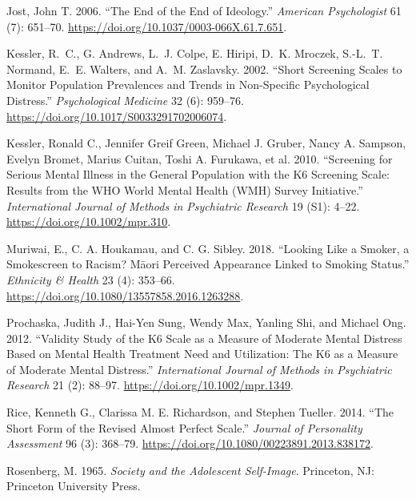 \documentclass[
  letterpaper,
  DIV=11,
  numbers=noendperiod]{scrartcl}
\newlength{\cslhangindent}
\newlength{\cslentryspacingunit} %
\newenvironment{CSLReferences}[2] %
 {%
  \setlength{\parindent}{0pt}
  \ifodd #1
  \let\oldpar\par
  \def\par{\hangindent=\cslhangindent\oldpar}
  \fi
  \setlength{\parskip}{#2\cslentryspacingunit}
 }%
 {}
\begin{document}
\begin{CSLReferences}{1}{0}
\leavevmode{}%
Jost, John T. 2006. {``The End of the End of Ideology.''} \emph{American
Psychologist} 61 (7): 651--70.
\url{https://doi.org/10.1037/0003-066X.61.7.651}.

\leavevmode{}%
Kessler, R.~C., G. Andrews, L.~J. Colpe, E. Hiripi, D.~K. Mroczek,
S.-L.~T. Normand, E.~E. Walters, and A.~M. Zaslavsky. 2002. {``Short
Screening Scales to Monitor Population Prevalences and Trends in
Non-Specific Psychological Distress.''} \emph{Psychological Medicine} 32
(6): 959--76. \url{https://doi.org/10.1017/S0033291702006074}.

\leavevmode{}%
Kessler, Ronald C., Jennifer Greif Green, Michael J. Gruber, Nancy A.
Sampson, Evelyn Bromet, Marius Cuitan, Toshi A. Furukawa, et al. 2010.
{``Screening for Serious Mental Illness in the General Population with
the K6 Screening Scale: Results from the WHO World Mental Health (WMH)
Survey Initiative.''} \emph{International Journal of Methods in
Psychiatric Research} 19 (S1): 4--22.
\url{https://doi.org/10.1002/mpr.310}.

\leavevmode{}%
Muriwai, E., C. A. Houkamau, and C. G. Sibley. 2018. {``Looking Like a
Smoker, a Smokescreen to Racism? Māori Perceived Appearance Linked to
Smoking Status.''} \emph{Ethnicity \& Health} 23 (4): 353--66.
\url{https://doi.org/10.1080/13557858.2016.1263288}.

\leavevmode{}%
Prochaska, Judith J., Hai-Yen Sung, Wendy Max, Yanling Shi, and Michael
Ong. 2012. {``Validity Study of the K6 Scale as a Measure of Moderate
Mental Distress Based on Mental Health Treatment Need and Utilization:
The K6 as a Measure of Moderate Mental Distress.''} \emph{International
Journal of Methods in Psychiatric Research} 21 (2): 88--97.
\url{https://doi.org/10.1002/mpr.1349}.

\leavevmode{}%
Rice, Kenneth G., Clarissa M. E. Richardson, and Stephen Tueller. 2014.
{``The Short Form of the Revised Almost Perfect Scale.''} \emph{Journal
of Personality Assessment} 96 (3): 368--79.
\url{https://doi.org/10.1080/00223891.2013.838172}.

\leavevmode{}%
Rosenberg, M. 1965. \emph{Society and the Adolescent Self-Image}.
Princeton, NJ: Princeton University Press.


\end{CSLReferences}
\end{document}
